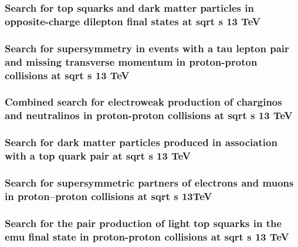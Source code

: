 \documentclass[a4paper, 11pt, twoside, openright]{report}
\begin{document}
\subsubsection{Search for top squarks and dark matter particles in opposite-charge dilepton final states at sqrt s 13 TeV}

\subsubsection{Search for supersymmetry in events with a tau lepton pair and missing transverse momentum in proton-proton collisions at sqrt s 13 TeV}

\subsubsection{Combined search for electroweak production of charginos and neutralinos in proton-proton collisions at sqrt s 13 TeV}

\subsubsection{Search for dark matter particles produced in association with a top quark pair at sqrt s 13 TeV}

\subsubsection{Search for supersymmetric partners of electrons and muons in proton–proton collisions at sqrt s 13TeV}

\subsubsection{Search for the pair production of light top squarks in the emu final state in proton-proton collisions at sqrt s 13 TeV}

\end{document}
